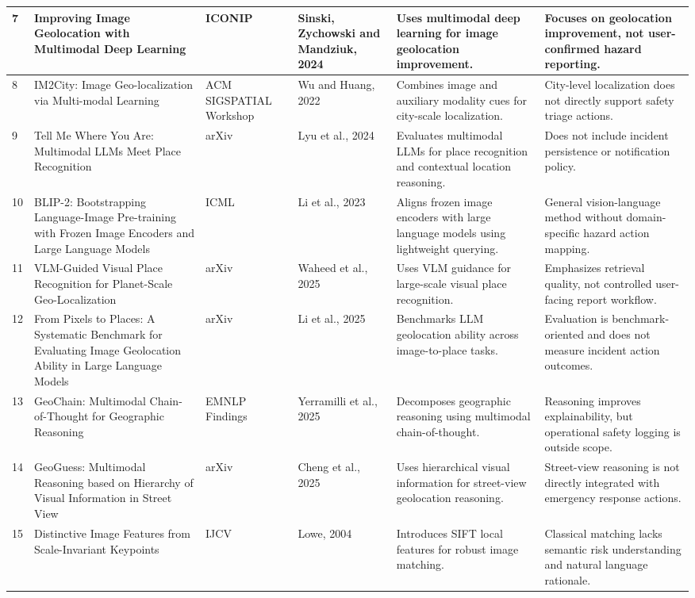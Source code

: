 \begin{longtable}{|p{}|p{}|p{}|p{}|p{}|p{}|}
\hline
7 & Improving Image Geolocation with Multimodal Deep Learning & ICONIP & Sinski, Zychowski and Mandziuk, 2024 & Uses multimodal deep learning for image geolocation improvement. & Focuses on geolocation improvement, not user-confirmed hazard reporting. \\
\hline
8 & IM2City: Image Geo-localization via Multi-modal Learning & ACM SIGSPATIAL Workshop & Wu and Huang, 2022 & Combines image and auxiliary modality cues for city-scale localization. & City-level localization does not directly support safety triage actions. \\
\hline
9 & Tell Me Where You Are: Multimodal LLMs Meet Place Recognition & arXiv & Lyu et al., 2024 & Evaluates multimodal LLMs for place recognition and contextual location reasoning. & Does not include incident persistence or notification policy. \\
\hline
10 & BLIP-2: Bootstrapping Language-Image Pre-training with Frozen Image Encoders and Large Language Models & ICML & Li et al., 2023 & Aligns frozen image encoders with large language models using lightweight querying. & General vision-language method without domain-specific hazard action mapping. \\
\hline
11 & VLM-Guided Visual Place Recognition for Planet-Scale Geo-Localization & arXiv & Waheed et al., 2025 & Uses VLM guidance for large-scale visual place recognition. & Emphasizes retrieval quality, not controlled user-facing report workflow. \\
\hline
12 & From Pixels to Places: A Systematic Benchmark for Evaluating Image Geolocation Ability in Large Language Models & arXiv & Li et al., 2025 & Benchmarks LLM geolocation ability across image-to-place tasks. & Evaluation is benchmark-oriented and does not measure incident action outcomes. \\
\hline
13 & GeoChain: Multimodal Chain-of-Thought for Geographic Reasoning & EMNLP Findings & Yerramilli et al., 2025 & Decomposes geographic reasoning using multimodal chain-of-thought. & Reasoning improves explainability, but operational safety logging is outside scope. \\
\hline
14 & GeoGuess: Multimodal Reasoning based on Hierarchy of Visual Information in Street View & arXiv & Cheng et al., 2025 & Uses hierarchical visual information for street-view geolocation reasoning. & Street-view reasoning is not directly integrated with emergency response actions. \\
\hline
15 & Distinctive Image Features from Scale-Invariant Keypoints & IJCV & Lowe, 2004 & Introduces SIFT local features for robust image matching. & Classical matching lacks semantic risk understanding and natural language rationale. \\

\end{longtable}
